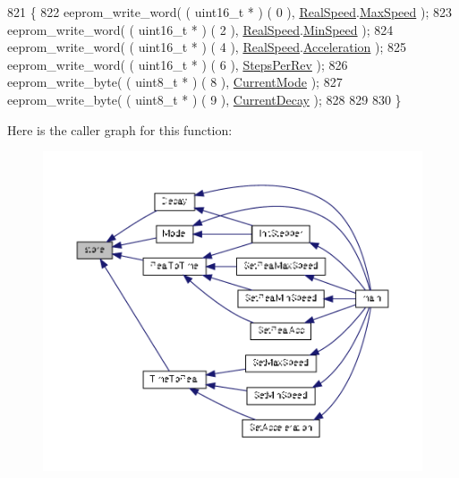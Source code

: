 \begin{DoxyCode}
821 \{
822     eeprom\_write\_word( ( uint16\_t * ) ( 0 ), \hyperlink{drv__8825_8c_a2e720ed1ed0ef90dba27c1f246048dcd}{RealSpeed}.\hyperlink{structMotor__Parameters_a501458e333945f49f03c295e2f49e3b9}{MaxSpeed} );
823     eeprom\_write\_word( ( uint16\_t * ) ( 2 ), \hyperlink{drv__8825_8c_a2e720ed1ed0ef90dba27c1f246048dcd}{RealSpeed}.\hyperlink{structMotor__Parameters_aaf0ac3ed818f5c89cc86ea1d9174dc43}{MinSpeed} );
824     eeprom\_write\_word( ( uint16\_t * ) ( 4 ), \hyperlink{drv__8825_8c_a2e720ed1ed0ef90dba27c1f246048dcd}{RealSpeed}.\hyperlink{structMotor__Parameters_aa9f1146edc6d945d535eec80a01481f1}{Acceleration} );
825     eeprom\_write\_word( ( uint16\_t * ) ( 6 ), \hyperlink{drv__8825_8c_a54128bfe0cfae9cbd8577cf456951f21}{StepsPerRev} );
826     eeprom\_write\_byte( ( uint8\_t * ) ( 8 ), \hyperlink{drv__8825_8c_ab08e51d202664c8cc9434eac6c46f1f3}{CurrentMode} );
827     eeprom\_write\_byte( ( uint8\_t * ) ( 9 ), \hyperlink{drv__8825_8c_a1cc7e950196402ba79f3e5098b08fa33}{CurrentDecay} );
828 
829 
830 \}
\end{DoxyCode}


Here is the caller graph for this function\-:
\nopagebreak
\begin{figure}[H]
\begin{center}
\leavevmode
\includegraphics[width=350pt]{group__biba__drv_gaaefaac2ed4c54f2008d8d236392c7261_icgraph}
\end{center}
\end{figure}


